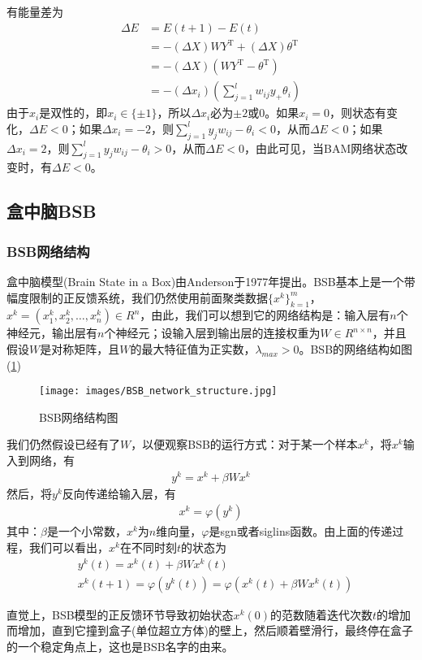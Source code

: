             有能量差为
            \begin{align*}
            \Delta E & = E(t+1) - E(t)\\
            & = -(\Delta X) WY^\mathrm{T}+(\Delta X)\theta^\mathrm{T}\\
            & =-(\Delta X) (WY^\mathrm{T} - \theta^\mathrm{T}) \\
            & = -(\Delta x_i) \left( \sum_{j=1}^l w_{ij}y_+\theta_i \right)
            \end{align*}
            由于$x_i$是双性的，即$x_i\in \{\pm 1\}$，所以$\Delta x_i$必为$\pm 2$或$0$。如果$x_i=0$，则状态有变化，$\Delta E <0$；如果$\Delta x_i = -2$，则$\sum\limits_{j=1}^l y_jw_{ij}-\theta_i <0$，从而$\Delta E < 0$；如果$\Delta x_i=2$，则$\sum\limits_{j=1}^ly_jw_{ij}-\theta_i > 0$，从而$\Delta E < 0$，由此可见，当BAM网络状态改变时，有$\Delta E <0$。

    \subsection{盒中脑BSB}
        \subsubsection{BSB网络结构}
            \par
            盒中脑模型(Brain State in a Box)由Anderson于1977年提出。BSB基本上是一个带幅度限制的正反馈系统，我们仍然使用前面聚类数据$\{x^k\}_{k=1}^m$，$x^k = (x_1^k,x_2^k,\dots,x_n^k)\in R^n$，由此，我们可以想到它的网络结构是：输入层有$n$个神经元，输出层有$n$个神经元；设输入层到输出层的连接权重为$W\in R^{n\times n}$，并且假设$W$是对称矩阵，且$W$的最大特征值为正实数，$\lambda_{max}>0$。BSB的网络结构如图(\ref{fig:BSB的网络结构图})
            \begin{figure}[H]
            \centering
            \texttt{[image: images/BSB\_network\_structure.jpg]}
            \caption{BSB网络结构图}
            \label{fig:BSB的网络结构图}
            \end{figure}
            我们仍然假设已经有了$W$，以便观察BSB的运行方式：对于某一个样本$x^k$，将$x^k$输入到网络，有
            \begin{align*}
            y^k = x^k+\beta W x^k
            \end{align*}
            然后，将$y^k$反向传递给输入层，有
            \begin{align*}
            x^k = \varphi(y^k)
            \end{align*}
            其中：$\beta$是一个小常数，$x^k$为$n$维向量，$\varphi$是sgn或者siglins函数。由上面的传递过程，我们可以看出，$x^k$在不同时刻$t$的状态为
            \begin{align*}
            & y^k(t) = x^k(t)+\beta W x^k(t)\\
            & x^k(t+1) = \varphi(y^k(t)) = \varphi(x^k(t)+\beta Wx^k(t))
            \end{align*}
            \par
            直觉上，BSB模型的正反馈环节导致初始状态$x^k(0)$的范数随着迭代次数$t$的增加而增加，直到它撞到盒子(单位超立方体)的壁上，然后顺着壁滑行，最终停在盒子的一个稳定角点上，这也是BSB名字的由来。
